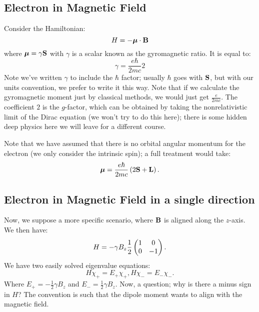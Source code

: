 \subsection{Electron in Magnetic Field}
Consider the Hamiltonian:
\begin{equation}
    H = -\mbox{\boldmath$ \mu $}\cdot \mathbf{B}
\end{equation}
where $\mbox{\boldmath$ \mu $} = \gamma\mathbf{S}$ with $\gamma$ is a scalar known as the gyromagnetic ratio. It is equal to:
\begin{equation}
    \gamma = \frac{e\hbar}{2mc}2
\end{equation}
Note we've written $\gamma$ to include the $\hbar$ factor; usually $\hbar$ goes with $\mathbf{S}$, but with our units convention, we prefer to write it this way. Note that if we calculate the gyromagnetic moment just by classical methods, we would just get $\frac{e}{2mc}$. The coefficient $2$ is the $g$-factor, which can be obtained by taking the nonrelativistic limit of the Dirac equation (we won't try to do this here); there is some hidden deep physics here we will leave for a different course.

Note that we have assumed that there is no orbital angular momentum for the electron (we only consider the intrinsic spin); a full treatment would take:
\begin{equation}
    \mbox{\boldmath$ \mu $} = \frac{e\hbar}{2mc}\left(2\mathbf{S} + \mathbf{L}\right).
\end{equation}

\subsection{Electron in Magnetic Field in a single direction}
Now, we suppose a more specific scenario, where $\mathbf{B}$ is aligned along the $z$-axis. We then have:
\begin{equation}
    H = -\gamma B_z\frac{1}{2}\begin{pmatrix} 1 & 0 \\ 0 & -1 \end{pmatrix}.
\end{equation}
We have two easily solved eigenvalue equations:
\begin{equation}
    H\chi_+ = E_+\chi_+, H\chi_- = E_-\chi_-.
\end{equation}
Where $E_+ = -\frac{1}{2}\gamma B_z$ and $E_- = \frac{1}{2}\gamma B_z$. Now, a question; why is there a minus sign in $H$? The convention is such that the dipole moment wants to align with the magnetic field. 

